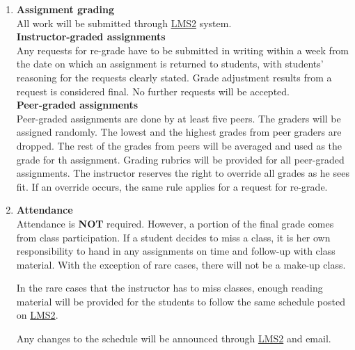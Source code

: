 \documentclass[a4paper,12pt]{article}
\begin{document}
\begin{enumerate}[label=\textbf{\Alph*}]
   \item \textbf{Assignment grading} \hfill \\
   All work will be submitted through \href{https://lms2.psu.ac.th/course/view.php?id=1025}{LMS2} system. \\
   \textbf{Instructor-graded assignments} \hfill \\
   Any requests for re-grade have to be submitted in writing within a week from the date on which an assignment is returned to students, with students' reasoning for the requests clearly stated. Grade adjustment results from a request is considered final. No further requests will be accepted.\\
   \textbf{Peer-graded assignments} \hfill \\
   Peer-graded assignments are done by at least five peers. The graders will be assigned randomly. The lowest and the highest grades from peer graders are dropped. The rest of the grades from peers will be averaged and used as the grade for th assignment. Grading rubrics will be provided for all peer-graded assignments. The instructor reserves the right to override all grades as he sees fit. If an override occurs, the same rule applies for a request for re-grade.
   \item \textbf{Attendance} \hfill \\
   Attendance is \textbf{NOT} required. However, a portion of the final grade comes from class participation. If a student decides to miss a class, it is her own responsibility to hand in any assignments on time and follow-up with class material. With the exception of rare cases, there will not be a make-up class.

   In the rare cases that the instructor has to miss classes, enough reading material will be provided for the students to follow the same schedule posted on \href{https://lms2.psu.ac.th/course/view.php?id=1025}{LMS2}.

   Any changes to the schedule will be announced through \href{https://lms2.psu.ac.th/course/view.php?id=1025}{LMS2} and email.
        
\end{enumerate}
\end{document}
